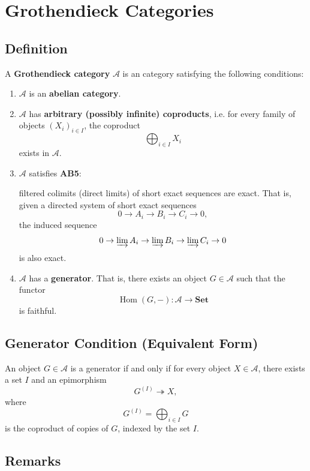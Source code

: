 \section{Grothendieck Categories}

\subsection{Definition}

A \textbf{Grothendieck category} $\mathcal{A}$ is an category satisfying the following conditions:

\begin{enumerate}
    \item $\mathcal{A}$ is an \textbf{abelian category}.

    \item $\mathcal{A}$ has \textbf{arbitrary (possibly infinite) coproducts}, i.e. for every family of objects $(X_i)_{i \in I}$, the coproduct
    \[
    \bigoplus_{i \in I} X_i
    \]
    exists in $\mathcal{A}$.

    \item $\mathcal{A}$ satisfies \textbf{AB5}:

    filtered colimits (direct limits) of short exact sequences are exact. That is, given a directed system of short exact sequences
    \[
    0 \to A_i \to B_i \to C_i \to 0,
    \]
    the induced sequence
    \[
    0 \to \varinjlim A_i \to \varinjlim B_i \to \varinjlim C_i \to 0
    \]
    is also exact.

    \item $\mathcal{A}$ has a \textbf{generator}. That is, there exists an object $G \in \mathcal{A}$ such that the functor
    \[
    \operatorname{Hom}(G,-): \mathcal{A} \to \mathbf{Set}
    \]
    is faithful.
\end{enumerate}

\subsection{Generator Condition (Equivalent Form)}

An object $G \in \mathcal{A}$ is a generator if and only if for every object $X \in \mathcal{A}$, there exists a set $I$ and an epimorphism
\[
G^{(I)} \twoheadrightarrow X,
\]
where
\[
G^{(I)} = \bigoplus_{i \in I} G
\]
is the coproduct of copies of $G$, indexed by the set $I$.

\subsection{Remarks}

